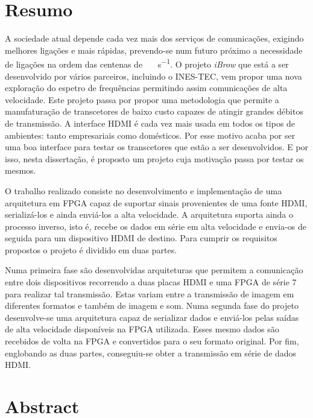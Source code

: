 \chapter*{Resumo}

A sociedade atual depende cada vez mais dos serviços de comunicações, exigindo melhores ligações e mais rápidas, prevendo-se num futuro próximo a necessidade de ligações na ordem das centenas de \SI{}{\giga\bit\per\second}. O projeto \textit{iBrow} que está a ser desenvolvido por vários parceiros, incluindo o INES-TEC, vem propor uma nova exploração do espetro de frequências permitindo assim comunicações de alta velocidade. Este projeto passa por propor uma metodologia que permite a manufaturação de transcetores de baixo custo capazes de atingir grandes débitos de transmissão. A interface HDMI é cada vez mais usada em todos os tipos de ambientes: tanto empresariais como domésticos. Por esse motivo acaba por ser uma boa interface para testar os transcetores que estão a ser desenvolvidos. E por isso, nesta dissertação, é proposto um projeto cuja motivação passa por testar os mesmos. 

O trabalho realizado consiste no desenvolvimento e implementação de  uma arquitetura em FPGA capaz de suportar sinais provenientes de uma fonte HDMI, serializá-los e ainda enviá-los a alta velocidade. A arquitetura suporta ainda o processo inverso, isto é, recebe os dados em série em alta velocidade e envia-os de seguida para um dispositivo HDMI de destino. Para cumprir os requisitos propostos o projeto é dividido em duas partes.

Numa primeira fase são desenvolvidas arquiteturas que permitem a comunicação entre dois dispositivos recorrendo a duas placas HDMI e uma FPGA de série 7 para realizar tal transmissão. Estas variam entre a transmissão de imagem em diferentes formatos e também de imagem e som. Numa segunda fase do projeto desenvolve-se uma arquitetura capaz de serializar dados e enviá-los pelas saídas de alta velocidade disponíveis na FPGA utilizada. Esses mesmo dados são recebidos de volta na FPGA e convertidos para o seu formato original. Por fim, englobando as duas partes, conseguiu-se obter a transmissão em série de dados HDMI.

\chapter*{Abstract}


